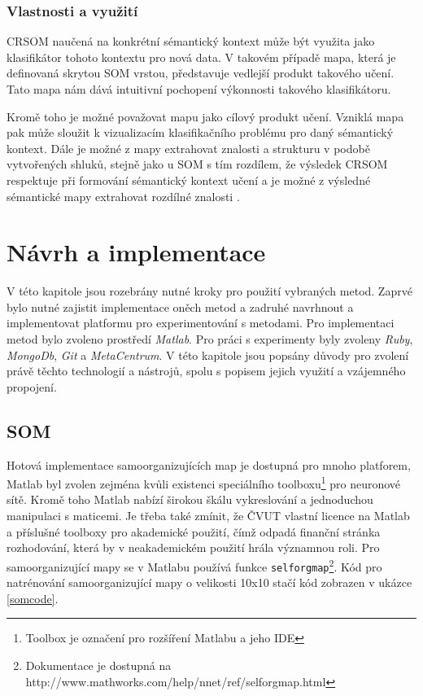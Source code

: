 \documentclass[thesis=M,czech]{FITthesis}[2012/06/26]
\begin{document}
\subsection{Vlastnosti a využití}

	CRSOM naučená na konkrétní sémantický kontext může být využita jako klasifikátor tohoto kontextu pro nová data. V takovém případě mapa, která je definovaná skrytou SOM vrstou, představuje vedlejší produkt takového učení. Tato mapa nám dává intuitivní pochopení výkonnosti takového klasifikátoru.

Kromě toho je možné považovat mapu jako cílový produkt učení. Vzniklá mapa pak může sloužit k vizualizacím klasifikačního problému pro daný sémantický kontext. Dále je možné z mapy extrahovat znalosti a strukturu v podobě vytvořených shluků, stejně jako u SOM s tím rozdílem, že výsledek CRSOM respektuje při formování sémantický kontext učení a je možné z výsledné sémantické mapy extrahovat rozdílné znalosti \cite{lms}.

\chapter{Návrh a implementace}\label{navrhimpl}
V této kapitole jsou rozebrány nutné kroky pro použití vybraných metod. Zaprvé bylo nutné zajistit implementace oněch metod a zadruhé navrhnout a implementovat platformu pro experimentování s metodami. Pro implementaci metod bylo zvoleno prostředí \textit{Matlab}. Pro práci s experimenty byly zvoleny \textit{Ruby}, \textit{MongoDb}, \textit{Git} a \textit{MetaCentrum}. V této kapitole jsou popsány důvody pro zvolení právě těchto technologií a nástrojů, spolu s popisem jejich využití a vzájemného propojení. 


\section{SOM}\label{sec:som_impl}
Hotová implementace samoorganizujících map je dostupná pro mnoho platforem, Matlab byl zvolen zejména kvůli existenci speciálního toolboxu\footnote{Toolbox je označení pro rozšíření Matlabu a jeho IDE} pro neuronové sítě. Kromě toho Matlab nabízí širokou škálu vykreslování a jednoduchou manipulaci s maticemi. Je třeba také zmínit, že ČVUT vlastní licence na Matlab a příslušné toolboxy pro akademické použití, čímž odpadá finanční stránka rozhodování, která by v neakademickém použití hrála významnou roli.
Pro samoorganizující mapy se v Matlabu používá funkce \texttt{selforgmap}\footnote{Dokumentace je dostupná na http://www.mathworks.com/help/nnet/ref/selforgmap.html}. Kód pro natrénování samoorganizující mapy o velikosti 10x10 stačí kód zobrazen v ukázce \ref{somcode}.
\end{document}
